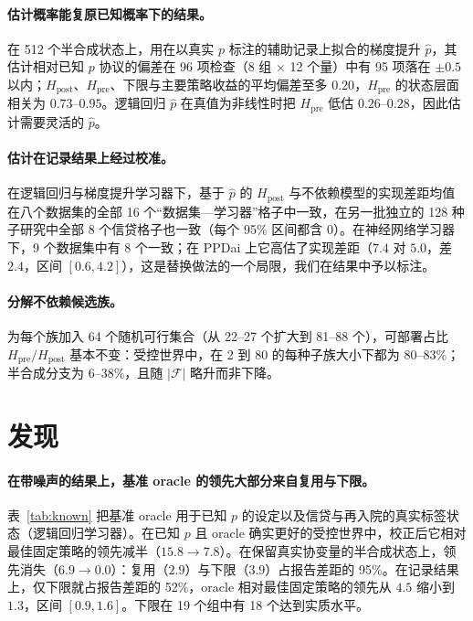 \documentclass[runningheads]{llncs}
\begin{document}
\paragraph{估计概率能复原已知概率下的结果。}在 512 个半合成状态上，用在以真实 $p$ 标注的辅助记录上拟合的梯度提升 $\hat p$，其估计相对已知 $p$ 协议的偏差在 96 项检查（8 组 $\times$ 12 个量）中有 95 项落在 $\pm0.5$ 以内；$H_{\mathrm{post}}$、$H_{\mathrm{pre}}$、下限与主要策略收益的平均偏差至多 $0.20$，$H_{\mathrm{pre}}$ 的状态层面相关为 $0.73$--$0.95$。逻辑回归 $\hat p$ 在真值为非线性时把 $H_{\mathrm{pre}}$ 低估 $0.26$--$0.28$，因此估计需要灵活的 $\hat p$。

\paragraph{估计在记录结果上经过校准。}在逻辑回归与梯度提升学习器下，基于 $\hat p$ 的 $H_{\mathrm{post}}$ 与不依赖模型的实现差距均值在八个数据集的全部 16 个“数据集—学习器”格子中一致，在另一批独立的 128 种子研究中全部 8 个信贷格子也一致（每个 95\% 区间都含 0）。在神经网络学习器下，9 个数据集中有 8 个一致；在 PPDai 上它高估了实现差距（$7.4$ 对 $5.0$，差 $2.4$，区间 $[0.6,4.2]$），这是替换做法的一个局限，我们在结果中予以标注。

\paragraph{分解不依赖候选族。}为每个族加入 64 个随机可行集合（从 22--27 个扩大到 81--88 个），可部署占比 $H_{\mathrm{pre}}/H_{\mathrm{post}}$ 基本不变：受控世界中，在 2 到 80 的每种子族大小下都为 80--83\%；半合成分支为 6--38\%，且随 $|\mathcal F|$ 略升而非下降。

\section{发现}
\label{sec:findings}
\paragraph{在带噪声的结果上，基准 oracle 的领先大部分来自复用与下限。}表~\ref{tab:known} 把基准 oracle 用于已知 $p$ 的设定以及信贷与再入院的真实标签状态（逻辑回归学习器）。在已知 $p$ 且 oracle 确实更好的受控世界中，校正后它相对最佳固定策略的领先减半（$15.8\to7.8$）。在保留真实协变量的半合成状态上，领先消失（$6.9\to0.0$）：复用（$2.9$）与下限（$3.9$）占报告差距的 95\%。在记录结果上，仅下限就占报告差距的 52\%，oracle 相对最佳固定策略的领先从 $4.5$ 缩小到 $1.3$，区间 $[0.9,1.6]$。下限在 19 个组中有 18 个达到实质水平。
\end{document}
